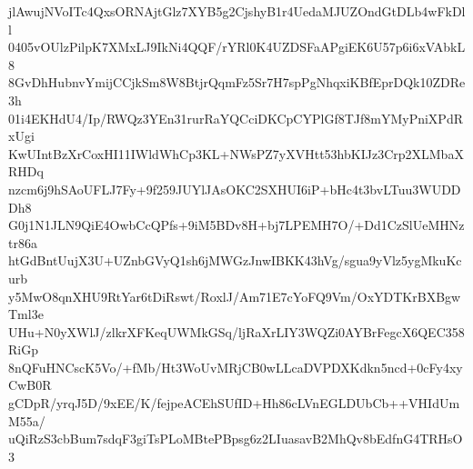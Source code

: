 jlAwujNVoITc4QxsORNAjtGlz7XYB5g2CjshyB1r4UedaMJUZOndGtDLb4wFkDll
0405vOUlzPilpK7XMxLJ9IkNi4QQF/rYRl0K4UZDSFaAPgiEK6U57p6i6xVAbkL8
8GvDhHubnvYmijCCjkSm8W8BtjrQqmFz5Sr7H7spPgNhqxiKBfEprDQk10ZDRe3h
01i4EKHdU4/Ip/RWQz3YEn31rurRaYQCciDKCpCYPlGf8TJf8mYMyPniXPdRxUgi
KwUIntBzXrCoxHI11IWldWhCp3KL+NWsPZ7yXVHtt53hbKIJz3Crp2XLMbaXRHDq
nzcm6j9hSAoUFLJ7Fy+9f259JUYlJAsOKC2SXHUI6iP+bHc4t3bvLTuu3WUDDDh8
G0j1N1JLN9QiE4OwbCcQPfs+9iM5BDv8H+bj7LPEMH7O/+Dd1CzSlUeMHNztr86a
htGdBntUujX3U+UZnbGVyQ1sh6jMWGzJnwIBKK43hVg/sgua9yVlz5ygMkuKcurb
y5MwO8qnXHU9RtYar6tDiRswt/RoxlJ/Am71E7cYoFQ9Vm/OxYDTKrBXBgwTml3e
UHu+N0yXWlJ/zlkrXFKeqUWMkGSq/ljRaXrLIY3WQZi0AYBrFegcX6QEC358RiGp
8nQFuHNCscK5Vo/+fMb/Ht3WoUvMRjCB0wLLcaDVPDXKdkn5ncd+0cFy4xyCwB0R
gCDpR/yrqJ5D/9xEE/K/fejpeACEhSUfID+Hh86cLVnEGLDUbCb++VHIdUmM55a/
uQiRzS3cbBum7sdqF3giTsPLoMBtePBpsg6z2LIuasavB2MhQv8bEdfnG4TRHsO3
